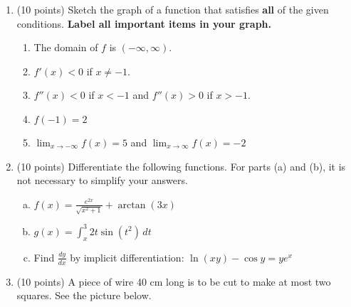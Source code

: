 \documentclass[11pt]{article}
\renewcommand{\d}{\displaystyle}
\begin{document}
\begin{enumerate}
\begin{enumerate}
\vfill
\end{enumerate}
\newpage
\item (10 points) Sketch the graph of a function that satisfies \textbf{all} of the given conditions. \textbf{Label all important items in your graph.}
	\begin{enumerate}
	\item The domain of $f$ is $(-\infty,\infty).$\\
	\item $f'(x) < 0$ if $x \not = -1.$\\
	\item $f''(x) < 0$ if $x < -1$ and $f''(x)>0$ if $x>-1.$\\
	\item $f(-1)=2$\\
	\item $\displaystyle \lim_{x \to -\infty} f(x)=5$ and $\displaystyle \lim_{x \to \infty} f(x)=-2$\\
	\end{enumerate}
	\begin{center}
	\end{center}
\newpage
\item (10 points) Differentiate the following functions. For parts (a) and (b), it is not necessary to simplify your answers.

\begin{enumerate}[(a)]
	\item $\d f(x) = \frac{e^{2x}}{\sqrt{x^2 + 1}} + \arctan(3x)$
	\vfill
	\item $\d g(x) = \int_x^3 2t\sin(t^2)\,dt$
	\vspace{1.5in}
	\item Find $\frac{dy}{dx}$ by implicit differentiation: $\d \ln(xy) - \cos y = ye^x$
	\vspace{3.5in}
	
	
\end{enumerate}

\newpage


\item (10 points) A piece of wire 40 cm long is to be cut to make at most two squares. See the picture below.

\begin{center}
\end{center}


\end{enumerate}
\end{document}
